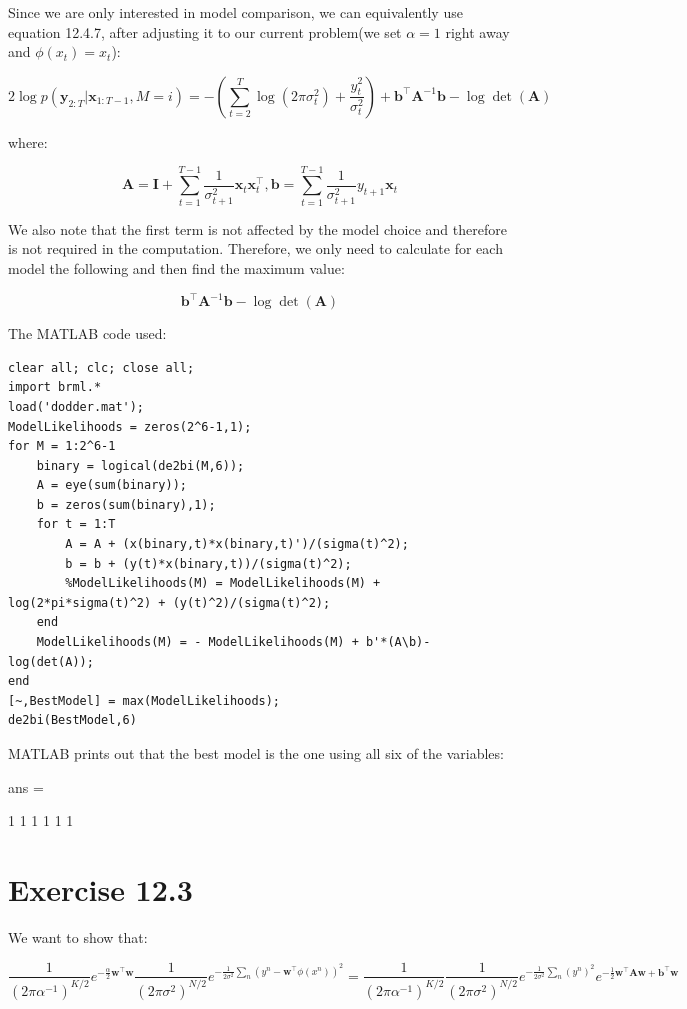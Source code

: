 \documentclass[11pt,a4paper,oneside]{report}
\begin{document}
Since we are only interested in model comparison, we can equivalently use equation 12.4.7, after adjusting it to our current problem(we set $\alpha = 1$ right away and $\phi(x_t)=x_t$):

$$2\log p(\mathbf{y}_{2:T}|\mathbf{x}_{1:T-1},M=i)=-\left(\sum_{t=2}^{T}\log \left(2\pi\sigma_t^2\right)+\frac{y_t^2}{\sigma_t^2}\right)+\mathbf{b}^\top\mathbf{A}^{-1}\mathbf{b}-\log \det (\mathbf{A})$$

where:

$$\mathbf{A}=\mathbf{I}+\sum_{t=1}^{T-1}\frac{1}{\sigma_{t+1}^2}\mathbf{x}_t\mathbf{x}_t^\top, \mathbf{b}=\sum_{t=1}^{T-1}\frac{1}{\sigma_{t+1}^2}y_{t+1}\mathbf{x}_t$$

We also note that the first term is not affected by the model choice and therefore is not required in the computation. Therefore, we only need to calculate for each model the following and then find the maximum value:

$$\mathbf{b}^\top\mathbf{A}^{-1}\mathbf{b}-\log \det (\mathbf{A})$$

The MATLAB code used:

\begin{lstlisting}
clear all; clc; close all;
import brml.*
load('dodder.mat');
ModelLikelihoods = zeros(2^6-1,1);
for M = 1:2^6-1
    binary = logical(de2bi(M,6));
    A = eye(sum(binary));
    b = zeros(sum(binary),1);
    for t = 1:T
        A = A + (x(binary,t)*x(binary,t)')/(sigma(t)^2);
        b = b + (y(t)*x(binary,t))/(sigma(t)^2);
        %ModelLikelihoods(M) = ModelLikelihoods(M) + log(2*pi*sigma(t)^2) + (y(t)^2)/(sigma(t)^2);
    end
    ModelLikelihoods(M) = - ModelLikelihoods(M) + b'*(A\b)-log(det(A));
end
[~,BestModel] = max(ModelLikelihoods);
de2bi(BestModel,6)
\end{lstlisting}

MATLAB prints out that the best model is the one using all six of the variables:

ans =

     1     1     1     1     1     1

\section*{Exercise 12.3}

We want to show that:

$$\frac{1}{(2\pi \alpha^{-1})^{K/2}}e^{-\frac{\alpha}{2}\mathbf{w}^\top \mathbf{w}}\frac{1}{(2\pi \sigma^{2})^{N/2}}e^{-\frac{1}{2\sigma^2}\sum_n (y^n-\mathbf{w}^\top \phi(x^n))^2}=\frac{1}{(2\pi \alpha^{-1})^{K/2}}\frac{1}{(2\pi \sigma^{2})^{N/2}}e^{-\frac{1}{2\sigma^2}\sum_n(y^n)^2}e^{-\frac{1}{2}\mathbf{w}^\top\mathbf{A}\mathbf{w}+\mathbf{b}^\top\mathbf{w}}$$
\end{document}
